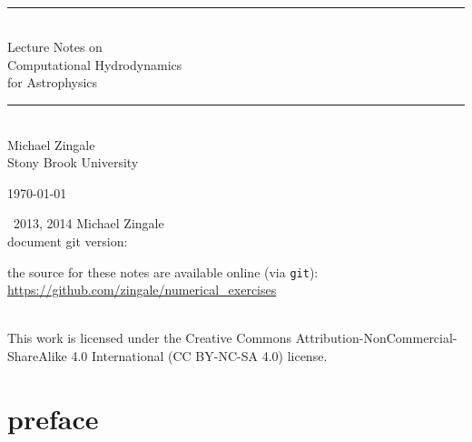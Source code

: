 \documentclass[11pt]{book}
\newcommand{\HRule}{\rule{\linewidth}{0.125mm}}
\newcommand{\git}{{\tt git}}
\renewcommand{\chaptermark}[1]{%
\markboth{\chaptername
\ \thechapter.\ #1}{}}
\begin{document}
\frontmatter

\begin{titlepage}

\ \\[2.5in]
\begin{center}
\HRule\\[0.5em]
{\Huge \textsf{{
Lecture Notes on\\[0.1em]
Computational Hydrodynamics\\[0.3em]
for Astrophysics}}
}
\HRule
\\[2em]

{\Large \sf Michael Zingale} \\ {\sf Stony Brook University}
\end{center}

\vfill

\begin{flushright}
\today
\end{flushright}

\end{titlepage}

\null \vfill 

\noindent \ccCopy\ 2013, 2014 Michael Zingale \\
\noindent document git version: 

\noindent the source for these notes are available online (via \git): 
\url{https://github.com/zingale/numerical_exercises}

\noindent \ccbyncsa \\
\noindent This work is licensed under the Creative Commons
Attribution-NonCommercial-ShareAlike 4.0 International (CC BY-NC-SA
4.0) license.


\clearpage

\pagestyle{plain}



\clearpage


\setcounter{tocdepth}{2}
\tableofcontents

\clearpage

\listoffigures
{}

\clearpage

\listofexercise
{}

\clearpage

\chapter*{preface}
\chaptermark{preface}
\end{document}
